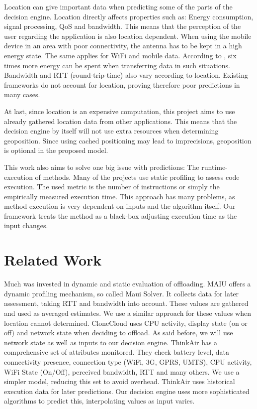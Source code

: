 \documentclass[10pt, conference, letterpaper]{IEEEtran}
\begin{document}
  Location can give important data when predicting some of the parts of the decision engine. Location directly affects properties such as: Energy consumption, signal processing, QoS and bandwidth. This means that the perception of the user regarding the application is also location dependent. When using the mobile device in an area with poor connectivity, the antenna has to be kept in a high energy state. The same applies for WiFi and mobile data. According to \cite{Schulman10bartendr:a}, six times more energy can be spent when transferring data in such situations. Bandwidth and RTT (round-trip-time) also vary according to location. Existing frameworks do not account for location, proving therefore poor predictions in many cases.
  
  At last, since location is an expensive computation, this project aims to use already gathered location data from other applications. This means that the decision engine by itself will not use extra resources when determining geoposition. Since using cached positioning may lead to imprecisions, geoposition is optional in the proposed model.

  This work also aims to solve one big issue with predictions: The runtime-execution of methods. Many of the projects use static profiling to assess code execution. The used metric is the number of instructions or simply the empirically measured execution time. This approach has many problems, as method execution is very dependent on inputs and the algorithm itself. Our framework treats the method as a black-box adjusting execution time as the input changes.

  \section{Related Work}

  Much was invested in dynamic and static evaluation of offloading. MAIU \cite{Cuervo:2010:MMS:1814433.1814441} offers a dynamic profiling mechanism, so called Maui Solver. It collects data for later assessment, taking RTT and bandwidth into account. These values are gathered and used as averaged estimates. We use a similar approach for these values when location cannot determined. CloneCloud \cite{Chun:2011:CEE:1966445.1966473} uses CPU activity, display state (on or off) and network state when deciding to offload. As said before, we will use network state as well as inputs to our decision engine. ThinkAir \cite{kosta2012thinkair} has a comprehensive set of attributes monitored. They check battery level, data connectivity presence, connection type (WiFi, 3G, GPRS, UMTS), CPU activity, WiFi State (On/Off), perceived bandwidth, RTT and many others. We use a simpler model, reducing this set to avoid overhead. ThinkAir uses historical execution data for later predictions. Our decision engine uses more sophisticated algorithms to predict this, interpolating values as input varies.
\end{document}
